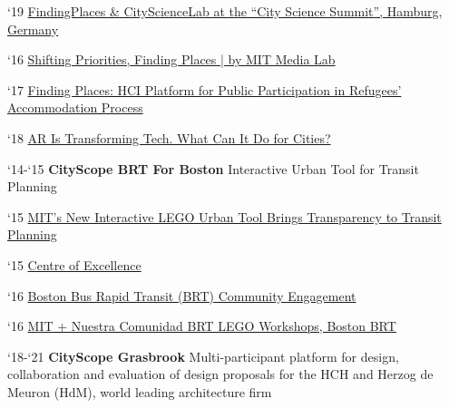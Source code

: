 \begin{tablist}
   \begin{tablist}

      \item[`19] \tab \href{https://www.youtube.com/watch?v=PZg6A_A65lQ}{FindingPlaces \& CityScienceLab at the “City Science Summit”, Hamburg, Germany}

      \item[`16] \tab  \href{https://medium.com/mit-media-lab/shifting-priorities-finding-places-9ad3bdbe38b8}{Shifting Priorities, Finding Places | by MIT Media Lab}

      \item[`17] \tab \href{https://www.media.mit.edu/publications/finding-places/}{Finding Places: HCI Platform for Public Participation in Refugees’ Accommodation Process}

      \item[`18] \tab  \href{https://datasmart.ash.harvard.edu/news/article/ar-transforming-tech-what-can-it-do-cities}{AR Is Transforming Tech. What Can It Do for Cities?}

   \end{tablist}


   \item[`14-`15] \tab \textbf{CityScope BRT For Boston} {Interactive Urban Tool for Transit Planning}

   \begin{tablist}

      \item[`15] \tab  \href{https://www.bloomberg.com/news/articles/2015-10-16/mit-s-new-interactive-lego-urban-tool-brings-transparency-to-transit-planning}
      {MIT's New Interactive LEGO Urban Tool Brings Transparency to Transit Planning}

      \item[`15] \tab  \href{http://www.brt.cl/new-tools-for-a-new-era-of-open-transportation-planning/}
      {Centre of Excellence}

      \item[`16] \tab  \href{https://www.media.mit.edu/projects/CityscopeBostonBRT/overview/}
      {Boston Bus Rapid Transit (BRT) Community Engagement}

      \item[`16] \tab  \href{http://www.bostonbrt.org/mit-nuestra-comunidad-brt-lego-workshops}
      {MIT + Nuestra Comunidad BRT LEGO Workshops, Boston BRT}

   \end{tablist}

   \item[`18-`21] \tab \textbf{CityScope Grasbrook} {Multi-participant platform for design, collaboration and evaluation of design proposals for the HCH and Herzog de Meuron (HdM), world leading architecture firm}



\end{tablist}
